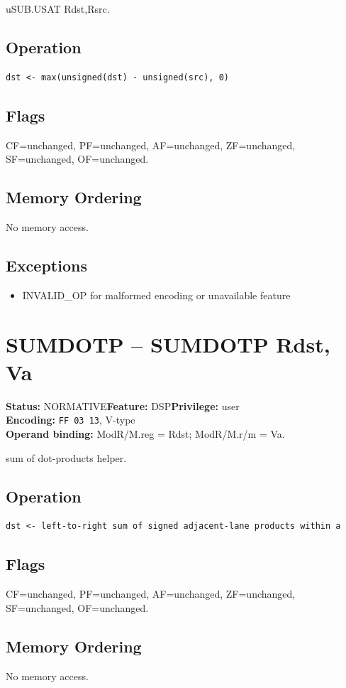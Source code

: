 \documentclass[10pt]{article}
\begin{document}
uSUB.USAT Rdst,Rsrc.

\subsection*{Operation}
\begin{lstlisting}
dst <- max(unsigned(dst) - unsigned(src), 0)
\end{lstlisting}
\subsection*{Flags}
CF=unchanged, PF=unchanged, AF=unchanged, ZF=unchanged, SF=unchanged, OF=unchanged.
\subsection*{Memory Ordering}
No memory access.
\subsection*{Exceptions}
\begin{itemize}
\item INVALID\_OP for malformed encoding or unavailable feature
\end{itemize}
\clearpage

\section{SUMDOTP -- SUMDOTP Rdst, Va}
\textbf{Status:} NORMATIVE\quad \textbf{Feature:} DSP\quad \textbf{Privilege:} user\\
\textbf{Encoding:} \texttt{FF 03 13}, V-type\\
\textbf{Operand binding:} ModR/M.reg = Rdst; ModR/M.r/m = Va.

sum of dot-products helper.

\subsection*{Operation}
\begin{lstlisting}
dst <- left-to-right sum of signed adjacent-lane products within a
\end{lstlisting}
\subsection*{Flags}
CF=unchanged, PF=unchanged, AF=unchanged, ZF=unchanged, SF=unchanged, OF=unchanged.
\subsection*{Memory Ordering}
No memory access.
\end{document}
